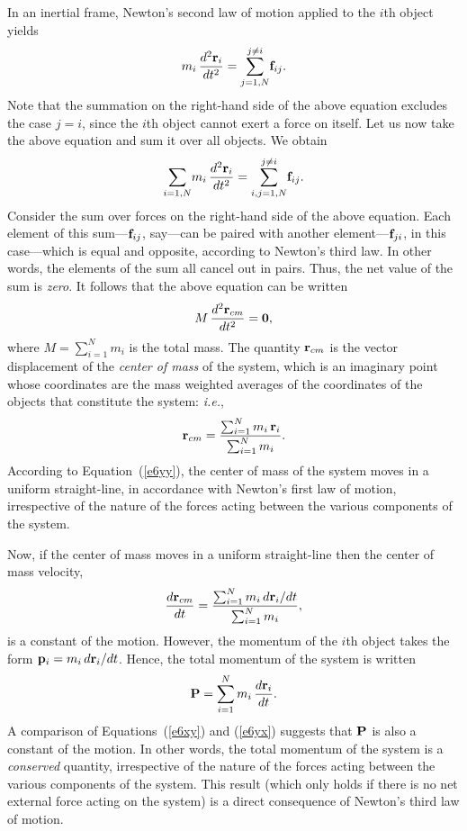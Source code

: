 In an inertial frame, Newton's second law of motion applied to the $i$th object yields
\begin{equation}\label{e3.24}
m_i\,\frac{d^2 {\bf r}_i}{dt^2} = \sum_{j=1,N}^{j\neq i}\! {\bf f}_{ij}.
\end{equation}
Note that the summation on the right-hand side of the above equation excludes the case
$j=i$, since the $i$th object cannot exert a force on itself. Let us now take the above
equation and sum it over all objects. We obtain
\begin{equation}
\sum_{i=1,N} \!m_i\,\frac{d^2 {\bf r}_i}{dt^2}=\sum_{i,j=1,N}^{j\neq i}\! {\bf f}_{ij}.
\end{equation}
Consider the sum  over forces on the right-hand side of the above equation.
Each element of this sum---${\bf f}_{ij}$, say---can be paired with another element---${\bf f}_{ji}$,
in this case---which is equal and opposite, according to Newton's third law. In other words,
 the elements of the sum all cancel out in pairs. Thus, the net value of the sum is {\em zero}.  
It follows that the above equation can be written
\begin{equation}\label{e6yy}
M\,\frac{d^2 {\bf r}_{cm}}{dt^2}= {\bf 0},
\end{equation}
where $M = \sum_{i=1}^N m_i$ is the total mass.  The quantity ${\bf r}_{cm}$ is the vector displacement of the {\em center of mass} of
the system, which is an imaginary point whose coordinates are the mass weighted
averages of the coordinates of the objects that constitute  the system: {\em i.e.}, 
\begin{equation}\label{e3.27}
{\bf r}_{cm} = \frac{\sum_{i=1}^N m_i\,{\bf r}_i}{\sum_{i=1}^N m_i}.
\end{equation}
According to Equation~(\ref{e6yy}), the center of mass of the
system moves in a uniform straight-line, in accordance with
Newton's first law of motion, irrespective of the nature of the
forces acting between the various components of the system.

Now, if the center of mass moves in a uniform straight-line  then
the  center of mass velocity,
\begin{equation}\label{e6xy}
\frac{d{\bf r}_{cm} }{dt}= \frac{\sum_{i=1}^N m_i\, d{\bf r}_i/dt}{\sum_{i=1}^N m_i},
\end{equation}
is a constant of the motion. However, the momentum of the $i$th object takes the
form ${\bf p}_i = m_i\,d{\bf r}_i/dt$. Hence, the total momentum of the
system is written
\begin{equation}\label{e6yx}
{\bf P} = \sum_{i=1}^N m_i\,\frac{d {\bf r}_i}{dt}.
\end{equation}
A comparison of Equations~(\ref{e6xy}) and (\ref{e6yx}) suggests that ${\bf P}$ is also
a constant of the motion. In other words, the total momentum
of the system is a {\em conserved}\/ quantity, irrespective of the nature of the
forces acting between the various components of the system. This result (which only holds if there is no net external force acting on the system) is
a direct consequence of Newton's third law of motion.

